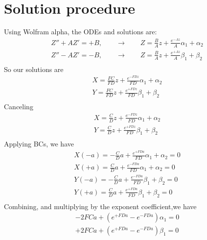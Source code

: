\documentclass[11pt]{article}
\begin{document}
\section{Solution procedure}
Using Wolfram alpha, the ODEs and solutions are:
\begin{equation}\begin{aligned}
	Z'' + A Z' = +B, \qquad \rightarrow \qquad Z = \frac{B}{A} z + \frac{e^{-A z}}{A} \alpha_1 +\alpha_2 \\
	Z'' - A Z' = -B, \qquad \rightarrow \qquad Z = \frac{B}{A} z + \frac{e^{+A z}}{A} \beta_1  +\beta_2  \\
\end{aligned} \end{equation}
So our solutions are
\begin{equation}\begin{aligned}
	X = \frac{FC}{FD} z + \frac{e^{-FD z}}{FD} \alpha_1 +\alpha_2 \\
	Y = \frac{FC}{FD} z + \frac{e^{+FD z}}{FD} \beta_1  +\beta_2  \\
\end{aligned} \end{equation}
Canceling
\begin{equation}\begin{aligned}
	X = \frac{C}{D} z + \frac{e^{-FD z}}{FD} \alpha_1 +\alpha_2 \\
	Y = \frac{C}{D} z + \frac{e^{+FD z}}{FD} \beta_1  +\beta_2  \\
\end{aligned} \end{equation}
Applying BCs, we have
\begin{equation}\begin{aligned}
	X(-a) = -\frac{C}{D} a + \frac{e^{+FD a}}{FD} \alpha_1 +\alpha_2 = 0\\
	X(+a) =  \frac{C}{D} a + \frac{e^{-FD a}}{FD} \alpha_1 +\alpha_2 = 0\\
	Y(-a) = -\frac{C}{D} a + \frac{e^{-FD a}}{FD} \beta_1  +\beta_2  = 0\\
	Y(+a) =  \frac{C}{D} a + \frac{e^{+FD a}}{FD} \beta_1  +\beta_2  = 0\\
\end{aligned} \end{equation}
Combining, and multiplying by the exponent coefficient,we have
\begin{equation}\begin{aligned}
- 2 FCa + \left(e^{+FD a} - e^{-FD a} \right) \alpha_1 = 0\\
+ 2 FCa + \left(e^{+FD a} - e^{-FD a} \right) \beta_1  = 0\\
\end{aligned} \end{equation}
\end{document}
